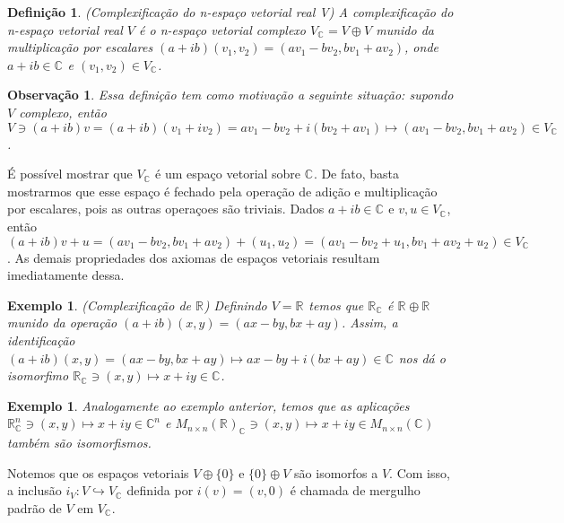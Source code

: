 \documentclass[12pt]{book}
\newtheorem{definicao}[teorema]{Definição}
\newtheorem{exemplo}[teorema]{Exemplo}
\newtheorem{observacao}[teorema]{Observação}
\newcommand{\complexificacao}[1]{#1_{\complexo{}}}
\newcommand{\complexo}[1]{\mathbb{C}^{#1}}
\newcommand{\matrizquadcomplexa}[1]{M_{#1 \times #1}(\complexo{})}
\newcommand{\matrizquadreal}[1]{M_{#1 \times #1}(\real{})}
\newcommand{\real}[1]{\mathbb{R}^{#1}}
\newcommand{\reta}{\real{}}
\begin{document}
	\begin{definicao}
		(Complexificação do n-espaço vetorial real V) A complexificação do n-espaço vetorial real $V$ é o n-espaço vetorial complexo $\complexificacao{V}=V\oplus V$ munido da multiplicação por escalares $(a+ib)(v_{1}, v_{2}) = (av_{1}-bv_{2}, bv_{1}+ av_{2})$, onde $a+ib \in \complexo{}$ e $(v_{1}, v_{2})\in \complexificacao{V}$.
	\end{definicao}
	
	\begin{observacao}
		Essa definição tem como motivação a seguinte situação: supondo $V$ complexo, então $V \ni (a+ib)v = (a+ib)(v_{1}+iv_{2}) = av_{1}-bv_{2}+i(bv_{2}+av_{1}) \mapsto (av_{1}-bv_{2}, bv_{1}+ av_{2}) \in \complexificacao{V}$.
	\end{observacao}
	
	É possível mostrar que $\complexificacao{V}$ é um espaço vetorial sobre $\complexo{}$. De fato, basta mostrarmos que esse espaço é fechado pela operação de adição e multiplicação por escalares, pois as outras operaçoes são triviais. Dados $a+ib \in \complexo{}$ e $v,u \in \complexificacao{V}$, então $(a+ib )v+u = (av_{1}-bv_{2}, bv_{1}+ av_{2}) + (u_{1}, u_{2}) = (av_{1}-bv_{2} + u_{1}, bv_{1}+ av_{2} + u_{2}) \in \complexificacao{V}$. As demais propriedades dos axiomas de espaços vetoriais resultam imediatamente dessa.
	
	\begin{exemplo}\label{exemplo_conjugado_reta_real}
		(Complexificação de $\reta$) Definindo $V = \reta$ temos que $\complexificacao{\reta}$ é $\reta\oplus \reta$ munido da operação $(a+ib)(x,y) = (ax-by, bx+ay)$. Assim, a identificação $(a+ib)(x, y ) = (ax-by, bx+ay) \mapsto ax-by+i(bx+ay) \in \complexo{}$ nos dá o isomorfimo $\complexificacao{\reta} \ni (x,y)\mapsto x +iy\in \complexo{}$.
	\end{exemplo}
	
	\begin{exemplo}\label{exemplo_complexificacao_matrizes}
		Analogamente ao exemplo anterior, temos que as aplicações $\complexificacao{\real{n}} \ni (x,y) \mapsto x+iy \in \complexo{n}$ e  $\complexificacao{\matrizquadreal{n}} \ni (x,y) \mapsto x+iy \in \matrizquadcomplexa{n}$ também são isomorfismos.
	\end{exemplo}
	
	Notemos que os espaços vetoriais $V\oplus\{0\}$ e $\{0\}\oplus V$ são isomorfos a $V$. Com isso, a inclusão $i_{V} :V \hookrightarrow \complexificacao{V}$ definida por $i(v) = (v, 0)$ é chamada de mergulho padrão de $V$ em $\complexificacao{V}$.
	
\end{document}
